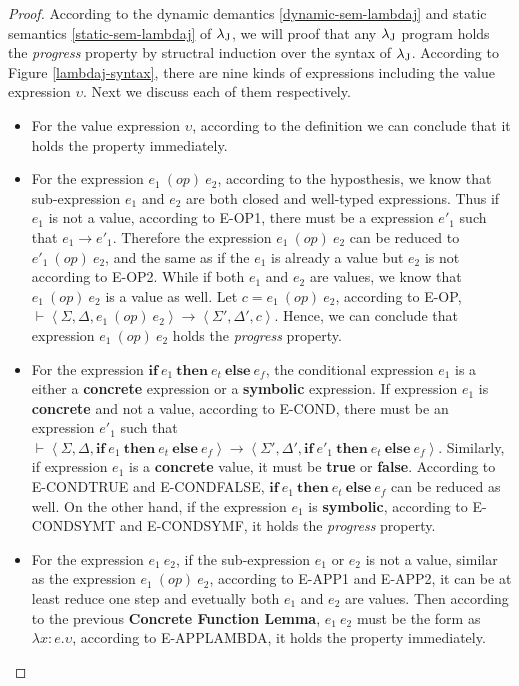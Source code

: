     \begin{proof}
        According to the dynamic demantics \ref{dynamic-sem-lambdaj} and static semantics \ref{static-sem-lambdaj} of ${\lambda_{\text{J}}}$, we will proof that any ${\lambda_{\text{J}}}$ program holds the \emph{progress} property by structral induction over the syntax of ${\lambda_{\text{J}}}$. According to Figure \ref{lambdaj-syntax}, there are nine kinds of expressions including the value expression $\upsilon$. Next we discuss each of them respectively.
        \begin{itemize}
            \item For the value expression $\upsilon$, according to the definition we can conclude that it holds the property immediately.
            \item For the expression $e_1~(op)~e_2$, according to the hyposthesis, we know that sub-expression $e_1$ and $e_2$ are both closed and well-typed expressions. Thus if $e_1$ is not a value, according to E-OP1, there must be a expression $e'_1$ such that $e_1\rightarrow e'_1$. Therefore the expression $e_1~(op)~e_2$ can be reduced to $e'_1~(op)~e_2$, and the same as if the $e_1$ is already a value but $e_2$ is not according to E-OP2. While if both $e_1$ and $e_2$ are values, we know that $e_1~(op)~e_2$ is a value as well. Let $c = e_1~(op)~e_2$, according to E-OP, $\vdash\left\langle\Sigma, \Delta, e_1~(op)~e_2 \right\rangle\rightarrow\left\langle\Sigma',\Delta',c \right\rangle$. Hence, we can conclude that expression $e_1~(op)~e_2$ holds the \emph{progress} property.
            \item For the expression $\textbf{if}~e_1~\textbf{then}~e_t~\textbf{else}~e_f$, the conditional expression $e_1$ is a either a \textbf{concrete} expression or a \textbf{symbolic} expression. If expression $e_1$ is \textbf{concrete} and not a value, according to E-COND, there must be an expression $e'_1$ such that $\vdash\left\langle\Sigma, \Delta, \textbf{if}~e_1~\textbf{then}~e_t~\textbf{else}~e_f \right\rangle\rightarrow\left\langle\Sigma',\Delta',\textbf{if}~e'_1~\textbf{then}~e_t~\textbf{else}~e_f \right\rangle$.  Similarly, if expression $e_1$ is a \textbf{concrete} value, it must be \textbf{true} or \textbf{false}. According to E-CONDTRUE and E-CONDFALSE, $\textbf{if}~e_1~\textbf{then}~e_t~\textbf{else}~e_f$ can be reduced as well. On the other hand, if the expression $e_1$ is \textbf{symbolic}, according to E-CONDSYMT and E-CONDSYMF, it holds the \emph{progress} property.
            \item For the expression $e_1~e_2$, if the sub-expression $e_1$ or $e_2$ is not a value, similar as the expression $e_1~(op)~e_2$, according to E-APP1 and E-APP2, it can be at least reduce one step and evetually both $e_1$ and $e_2$ are values. Then according to the previous \textbf{Concrete Function Lemma}, $e_1~e_2$ must be the form as $\lambda x:e.\upsilon$, according to E-APPLAMBDA, it holds the property immediately.

\end{itemize}
\end{proof}
